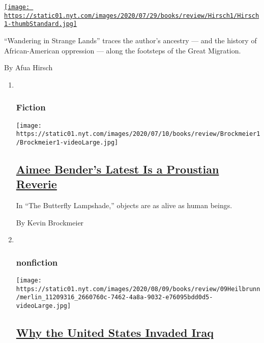 \begin{enumerate}
\begin{enumerate}
    \href{/2020/08/03/books/review/wandering-in-strange-lands-morgan-jerkins.html}{\texttt{[image: https://static01.nyt.com/images/2020/07/29/books/review/Hirsch1/Hirsch1-thumbStandard.jpg]}}

    ``Wandering in Strange Lands'' traces the author's ancestry --- and
    the history of African-American oppression --- along the footsteps
    of the Great Migration.

    By Afua Hirsch
  \end{enumerate}
\end{enumerate}

\begin{enumerate}
\def\labelenumi{\arabic{enumi}.}
\item ~
  \hypertarget{fiction}{%
  \subsubsection{Fiction}\label{fiction}}

  \texttt{[image: https://static01.nyt.com/images/2020/07/10/books/review/Brockmeier1/Brockmeier1-videoLarge.jpg]}

  \hypertarget{aimee-benders-latest-is-a-proustian-reverie}{%
  \subsection{\texorpdfstring{\href{/2020/07/28/books/review/aimee-bender-the-butterfly-lampshade.html}{Aimee
  Bender's Latest Is a Proustian
  Reverie}}{Aimee Bender's Latest Is a Proustian Reverie}}\label{aimee-benders-latest-is-a-proustian-reverie}}

  In ``The Butterfly Lampshade,'' objects are as alive as human beings.

  By Kevin Brockmeier
\item ~
  \hypertarget{nonfiction-4}{%
  \subsubsection{nonfiction}\label{nonfiction-4}}

  \texttt{[image: https://static01.nyt.com/images/2020/08/09/books/review/09Heilbrunn/merlin\_11209316\_2660760c-7462-4a8a-9032-e76095bdd0d5-videoLarge.jpg]}

  \hypertarget{why-the-united-states-invaded-iraq}{%
  \subsection{\texorpdfstring{\href{/2020/07/28/books/review/to-start-a-war-robert-draper.html}{Why
  the United States Invaded
  Iraq}}{Why the United States Invaded Iraq}}\label{why-the-united-states-invaded-iraq}}


\end{enumerate}
